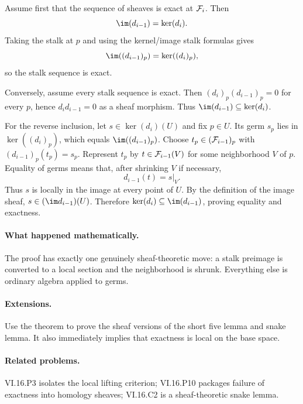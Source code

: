 \begin{solution}
Assume first that the sequence of sheaves is exact at $\mathcal F_i$.  Then
\[
\im(d_{i-1})=\ker(d_i).
\]
Taking the stalk at $p$ and using the kernel/image stalk formulas gives
\[
\im((d_{i-1})_p)=\ker((d_i)_p),
\]
so the stalk sequence is exact.

Conversely, assume every stalk sequence is exact.  Then
$(d_i)_p(d_{i-1})_p=0$ for every $p$, hence $d_i d_{i-1}=0$ as a sheaf morphism.  Thus
$\im(d_{i-1})\subseteq\ker(d_i)$.

For the reverse inclusion, let $s\in\ker(d_i)(U)$ and fix $p\in U$.  Its germ
$s_p$ lies in $\ker((d_i)_p)$, which equals $\im((d_{i-1})_p)$.  Choose
$t_p\in(\mathcal F_{i-1})_p$ with $(d_{i-1})_p(t_p)=s_p$.  Represent $t_p$ by
$t\in\mathcal F_{i-1}(V)$ for some neighborhood $V$ of $p$.  Equality of germs means that, after
shrinking $V$ if necessary,
\[
d_{i-1}(t)=s|_V.
\]
Thus $s$ is locally in the image at every point of $U$.  By the definition of the image
sheaf, $s\in(\im d_{i-1})(U)$.  Therefore
$\ker(d_i)\subseteq\im(d_{i-1})$, proving equality and exactness.
\end{solution}

\paragraph{What happened mathematically.}
The proof has exactly one genuinely sheaf-theoretic move: a stalk preimage is converted to a local section and the neighborhood is shrunk.  Everything else is ordinary algebra applied to germs.

\paragraph{Extensions.}
Use the theorem to prove the sheaf versions of the short five lemma and snake lemma.  It also immediately implies that exactness is local on the base space.

\paragraph{Related problems.}
VI.16.P3 isolates the local lifting criterion; VI.16.P10 packages failure of exactness into homology sheaves; VI.16.C2 is a sheaf-theoretic snake lemma.
\fi
